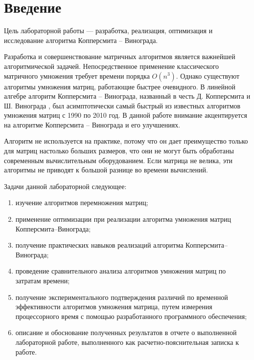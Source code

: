 
\chapter*{Введение}

Цель лабораторной работы --- разработка, реализация, оптимизация и исследование алгоритма Копперсмита – Винограда.


Разработка и совершенствование матричных алгоритмов является важнейшей алгоритмической задачей. Непосредственное применение классического матричного умножения требует времени порядка $O(n^3)$. Однако существуют алгоритмы умножения матриц, работающие быстрее очевидного. В линейной алгебре алгоритм Копперсмита – Винограда\cite{winograd-origin}, названный в честь Д. Копперсмита и Ш. Винограда , был асимптотически самый быстрый из известных алгоритмов умножения матриц с 1990 по 2010 год. В данной работе внимание акцентируется на алгоритме Копперсмита – Винограда и его улучшениях. 

Алгоритм не используется на практике, потому что он дает преимущество только для матриц настолько больших размеров, что они не могут быть обработаны современным вычислительным оборудованием. Если матрица не велика, эти алгоритмы не приводят к большой разнице во времени вычислений. 

\newpage

Задачи данной лабораторной следующее:

\begin{enumerate}[label=\arabic*)]
	\item изучение алгоритмов перемножения матриц;
	
	\item применение оптимизации при реализации алгоритма умножения матриц Копперсмита–Винограда;
	
	\item получение практических навыков реализаций алгоритма Копперсмита–Винограда;
	
	\item проведение сравнительного анализа алгоритмов умножения матриц по затратам времени;
	
	\item получение экспериментального подтверждения различий по временной эффективности алгоритмов умножения матрица, путем измерения процессорного время с помощью разработанного программного обеспечения;
	
	\item описание и обоснование полученных результатов в отчете о выполненной лабораторной работе, выполненного как расчетно-пояснительная записка к работе. 
\end{enumerate}